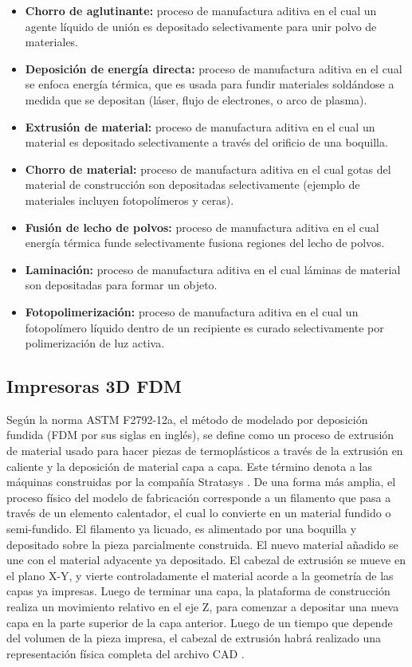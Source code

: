 \begin{itemize}
\item \textbf{Chorro de aglutinante:} proceso de manufactura aditiva en el cual un agente líquido de unión es depositado selectivamente para unir polvo de materiales.
\item \textbf{Deposición de energía directa:} proceso de manufactura aditiva en el cual se enfoca energía térmica, que es usada para fundir materiales soldándose a medida que se depositan (láser, flujo de electrones, o arco de plasma).
\item \textbf{Extrusión de material:} proceso de manufactura aditiva en el cual un material es depositado selectivamente a través del orificio de una boquilla.
\item \textbf{Chorro de material:} proceso de manufactura aditiva en el cual gotas del material de construcción son depositadas selectivamente (ejemplo de materiales incluyen fotopolímeros y ceras).
\item \textbf{Fusión de lecho de polvos:} proceso de manufactura aditiva en el cual energía térmica funde selectivamente fusiona regiones del lecho de polvos.
\item \textbf{Laminación:} proceso de manufactura aditiva en el cual láminas de material son depositadas para formar un objeto.
\item \textbf{Fotopolimerización:} proceso de manufactura aditiva en el cual un fotopolímero líquido dentro de un recipiente es curado selectivamente por polimerización de luz activa.
\end{itemize}


\subsection{Impresoras 3D FDM}

Según la norma ASTM F2792-12a, el método de modelado por deposición fundida (FDM por sus siglas en inglés), se define como un proceso de extrusión de material usado para hacer piezas de termoplásticos a través de la extrusión en caliente y la deposición de material capa a capa. Este término denota a las máquinas construidas por la compañía Stratasys \citep{astm2013}. De una forma más amplia, el proceso físico del modelo de fabricación corresponde a un filamento que pasa a través de un elemento calentador, el cual lo convierte en un material fundido o semi-fundido. El filamento ya licuado, es alimentado por una boquilla y depositado sobre la pieza parcialmente construida. El nuevo material añadido se une con el material adyacente ya depositado. El cabezal de extrusión se mueve en el plano X-Y, y vierte controladamente el material acorde a la geometría de las capas ya impresas. Luego de terminar una capa, la plataforma de construcción realiza un movimiento relativo en el eje Z, para comenzar a depositar una nueva capa en la parte superior de la capa anterior. Luego de un tiempo que depende del volumen de la pieza impresa, el cabezal de extrusión habrá realizado una representación física completa del archivo CAD \citep{pdudek2013}.

